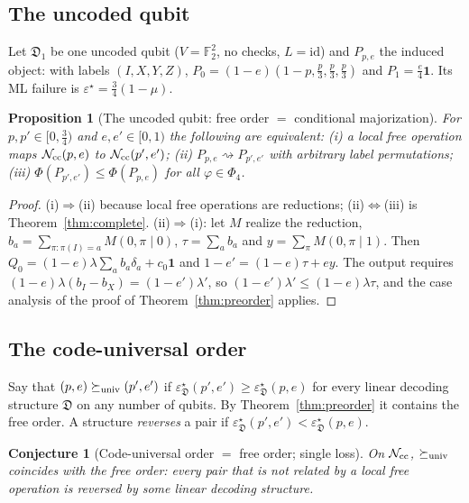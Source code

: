 \documentclass[11pt,a4paper]{article}
\theoremstyle{plain}
\newtheorem{proposition}[theorem]{Proposition}
\newtheorem{conjecture}[theorem]{Conjecture}
\theoremstyle{definition}
\theoremstyle{remark}
\newcommand{\F}{\mathbb{F}_2}
\newcommand{\err}{\varepsilon^{\star}}
\newcommand{\Ncc}{\mathcal{N}_{\rm cc}}
\newcommand{\red}{\rightsquigarrow}
\begin{document}
\subsection{The uncoded qubit}

Let $\mathfrak D_1$ be one uncoded qubit ($V=\F^2$, no checks, $L=\mathrm{id}$) and $P_{p,e}$ the induced object: with labels $(I,X,Y,Z)$, $P_0=(1-e)(1-p,\tfrac p3,\tfrac p3,\tfrac p3)$ and $P_1=\tfrac e4\mathbf 1$. Its ML failure is $\err=\tfrac34(1-\mu)$.

\begin{proposition}[The uncoded qubit: free order $=$ conditional majorization]\label{prop:local-level1}
For $p,p'\in[0,\tfrac34)$ and $e,e'\in[0,1)$ the following are equivalent: (i) a local free operation maps $\Ncc(p,e)$ to $\Ncc(p',e')$; (ii) $P_{p,e}\red P_{p',e'}$ with arbitrary label permutations; (iii) $\Phi(P_{p',e'})\le\Phi(P_{p,e})$ for all $\varphi\in\Phi_4$.
\end{proposition}
\begin{proof}
(i)$\Rightarrow$(ii) because local free operations are reductions; (ii)$\Leftrightarrow$(iii) is Theorem~\ref{thm:complete}. (ii)$\Rightarrow$(i): let $M$ realize the reduction, $b_a=\sum_{\pi:\pi(I)=a}M(0,\pi\mid0)$, $\tau=\sum_ab_a$ and $y=\sum_\pi M(0,\pi\mid1)$. Then $Q_0=(1-e)\lambda\sum_ab_a\delta_a+c_0\mathbf 1$ and $1-e'=(1-e)\tau+ey$. The output requires $(1-e)\lambda(b_I-b_X)=(1-e')\lambda'$, so $(1-e')\lambda'\le(1-e)\lambda\tau$, and the case analysis of the proof of Theorem~\ref{thm:preorder} applies.
\end{proof}

\subsection{The code-universal order}\label{sec:universal}

Say that $(p,e)\succeq_{\rm univ}(p',e')$ if $\err_{\mathfrak D}(p',e')\ge\err_{\mathfrak D}(p,e)$ for every linear decoding structure $\mathfrak D$ on any number of qubits. By Theorem~\ref{thm:preorder} it contains the free order. A structure \emph{reverses} a pair if $\err_{\mathfrak D}(p',e')<\err_{\mathfrak D}(p,e)$.

\begin{conjecture}[Code-universal order $=$ free order; single loss]\label{conj:universal}
On $\Ncc$, $\succeq_{\rm univ}$ coincides with the free order: every pair that is not related by a local free operation is reversed by some linear decoding structure.
\end{conjecture}
\end{document}
